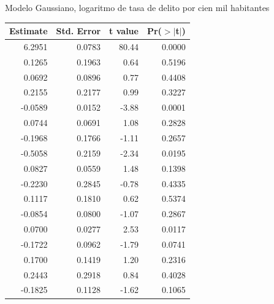 \documentclass[ignorenonframetext,]{beamer}
\begin{document}
\begin{frame}{Modelo Gaussiano, logaritmo de tasa de delito por cien mil
habitantes}

\begin{table}[ht]
\centering
{\tiny
\begin{tabular}{rrrr}
  \hline
Estimate & Std. Error & t value & Pr($>$$|$t$|$) \\ 
  \hline
6.2951 & 0.0783 & 80.44 & 0.0000 \\ 
  0.1265 & 0.1963 & 0.64 & 0.5196 \\ 
  0.0692 & 0.0896 & 0.77 & 0.4408 \\ 
  0.2155 & 0.2177 & 0.99 & 0.3227 \\ 
  -0.0589 & 0.0152 & -3.88 & 0.0001 \\ 
  0.0744 & 0.0691 & 1.08 & 0.2828 \\ 
  -0.1968 & 0.1766 & -1.11 & 0.2657 \\ 
  -0.5058 & 0.2159 & -2.34 & 0.0195 \\ 
  0.0827 & 0.0559 & 1.48 & 0.1398 \\ 
  -0.2230 & 0.2845 & -0.78 & 0.4335 \\ 
  0.1117 & 0.1810 & 0.62 & 0.5374 \\ 
  -0.0854 & 0.0800 & -1.07 & 0.2867 \\ 
  0.0700 & 0.0277 & 2.53 & 0.0117 \\ 
  -0.1722 & 0.0962 & -1.79 & 0.0741 \\ 
  0.1700 & 0.1419 & 1.20 & 0.2316 \\ 
  0.2443 & 0.2918 & 0.84 & 0.4028 \\ 
  -0.1825 & 0.1128 & -1.62 & 0.1065 \\ 
   \hline
\end{tabular}
}
\end{table}

\end{frame}
\end{document}
